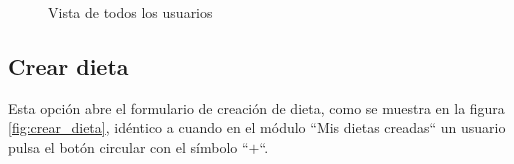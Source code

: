 \begin{figure}[H]
    \centering
    \caption{Vista de todos los usuarios}
    \label{fig:todos_usuarios}
\end{figure}


\subsection{Crear dieta}
Esta opción abre el formulario de creación de dieta, como se muestra en la figura \ref{fig:crear_dieta}, idéntico a cuando en el módulo ``Mis dietas creadas`` un usuario pulsa el botón circular con el símbolo ``$+$``.

